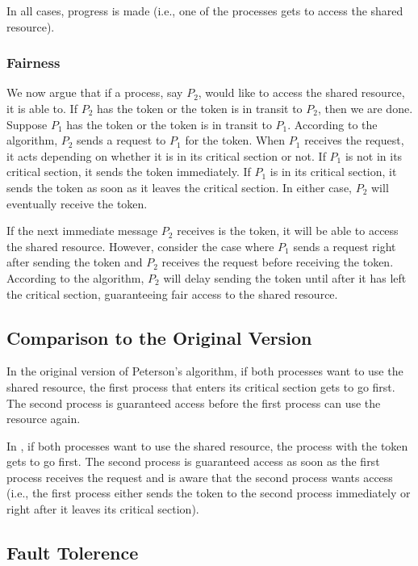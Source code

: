 \documentclass[final]{article}
\begin{document}
In all cases, progress is made (i.e., one of the processes gets to
access the shared resource).


\subsubsection{Fairness}


We now argue that if a process, say $P_2$, would like to access the
shared resource, it is able to.
%
If $P_2$ has the token or the token is in transit to $P_2$, then we
are done.
%
Suppose $P_1$ has the token or the token is in transit to $P_1$.
%
According to the algorithm, $P_2$ sends a request to $P_1$ for the
token.
%
When $P_1$ receives the request, it acts depending on whether it is in
its critical section or not.
%
If $P_1$ is not in its critical section, it sends the token
immediately.
%
If $P_1$ is in its critical section, it sends the token as soon as it
leaves the critical section.
%
In either case, $P_2$ will eventually receive the token.

If the next immediate message $P_2$ receives is the token, it will be
able to access the shared resource.
%
However, consider the case where $P_1$ sends a request right after
sending the token and $P_2$ receives the request before receiving the
token.
%
According to the algorithm, $P_2$ will delay sending the token until
after it has left the critical section, guaranteeing fair access to
the shared resource.


\subsection{Comparison to the Original Version}

In the original version of Peterson's algorithm, if both processes
want to use the shared resource, the first process that enters its
critical section gets to go first.
%
The second process is guaranteed access before the first process can
use the resource again.


In \mpp, if both processes want to use the shared resource,
the process with the token gets to go first.
%
The second process is guaranteed access as soon as the first process
receives the request and is aware that the second process wants access
(i.e., the first process either sends the token to the second process
immediately or right after it leaves its critical section).
%


\subsection{Fault Tolerence}
\end{document}
